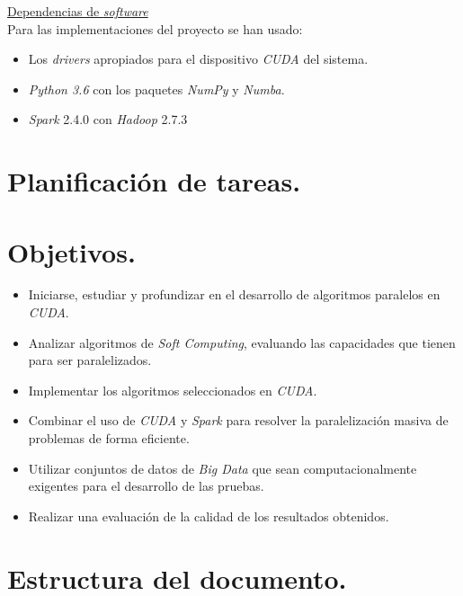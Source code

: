 \documentclass[a4paper,oneside,11pt,titlepage]{book}
\begin{document}
\underline{Dependencias de \textit{software}}\\
Para las implementaciones del proyecto se han usado:
\begin{itemize}
  \item Los \textit{drivers} apropiados para el dispositivo \textit{CUDA} del sistema.
  \item \textit{Python 3.6} con los paquetes \textit{NumPy} y \textit{Numba}.
  \item \textit{Spark} 2.4.0 con \textit{Hadoop} 2.7.3
\end{itemize}

\section{Planificación de tareas.}

\section{Objetivos.}
\begin{itemize}
    \item Iniciarse, estudiar y profundizar en el desarrollo de algoritmos paralelos en \textit{CUDA}.
    \item Analizar algoritmos de \textit{Soft Computing}, evaluando las capacidades que tienen para ser paralelizados.
    \item Implementar los algoritmos seleccionados en \textit{CUDA}.
    \item Combinar el uso de \textit{CUDA} y \textit{Spark} para resolver la paralelización masiva de problemas de forma eficiente.
    \item Utilizar conjuntos de datos de \textit{Big Data} que sean computacionalmente exigentes para el desarrollo de las pruebas.
    \item Realizar una evaluación de la calidad de los resultados obtenidos.
\end{itemize}

\section{Estructura del documento.}
\end{document}

